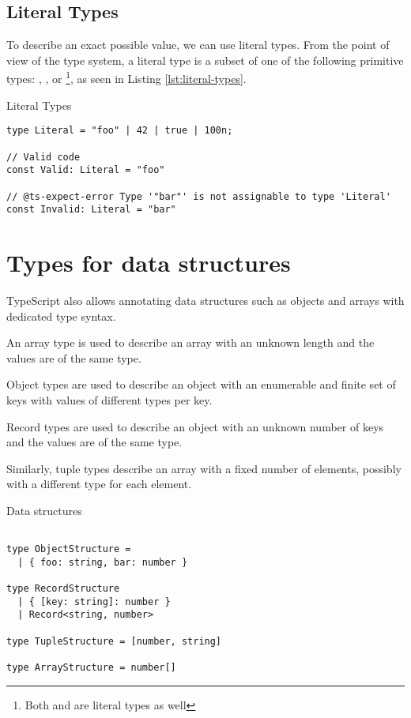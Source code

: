 \subsection{Literal Types}

To describe an exact possible value, we can use literal types. From the point of view of the type system, a literal type is a subset of one of the following primitive types: , ,  or \footnote{Both  and  are literal types as well}, as seen in Listing \ref{lst:literal-types}.

\begin{listing}[ht]
  \caption{Literal Types}\label{lst:literal-types}
  \begin{verbatim}
type Literal = "foo" | 42 | true | 100n;

// Valid code
const Valid: Literal = "foo"

// @ts-expect-error Type '"bar"' is not assignable to type 'Literal'
const Invalid: Literal = "bar" 
\end{verbatim}
\end{listing}

\section{Types for data structures}

TypeScript also allows annotating data structures such as objects and arrays with dedicated type syntax.


An array type is used to describe an array with an unknown length and the values are of the same type.


Object types are used to describe an object with an enumerable and finite set of keys with values of different types per key.




Record types are used to describe an object with an unknown number of keys and the values are of the same type.


Similarly, tuple types describe an array with a fixed number of elements, possibly with a different type for each element.

\begin{listing}[ht]
  \caption{Data structures}\label{lst:data-structures}
  \begin{verbatim}

type ObjectStructure =  
  | { foo: string, bar: number }

type RecordStructure 
  | { [key: string]: number }
  | Record<string, number>

type TupleStructure = [number, string]

type ArrayStructure = number[]
\end{verbatim}
\end{listing}

